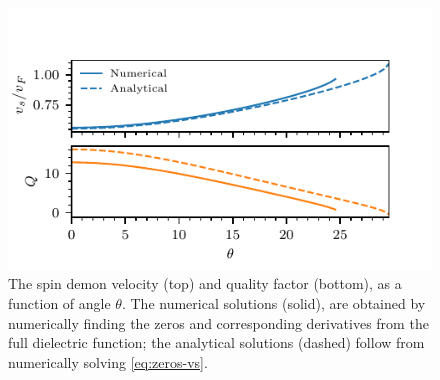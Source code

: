 \documentclass[aps,prl,reprint,twocolumns,superscriptaddress]{revtex4-2}
\begin{document}
	\begin{figure}
		\includegraphics{angles_vs_and_Q}
		\caption{The spin demon velocity (top) and quality factor (bottom), as a function of angle $\theta$. The numerical solutions (solid),  are obtained by numerically finding the zeros and corresponding derivatives from the full dielectric function; the analytical solutions (dashed) follow from numerically solving \cref{eq:zeros-vs}. 
			\label{fig:vs-and-Q} }
	\end{figure}
\end{document}
